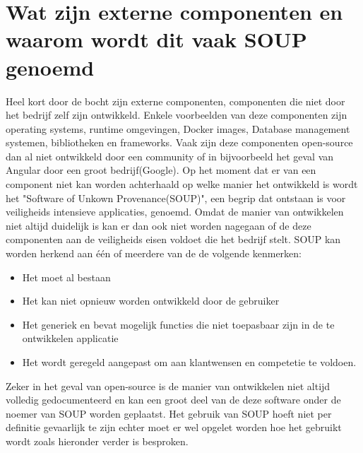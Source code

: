 \section{Wat zijn externe componenten en waarom wordt dit vaak SOUP genoemd}\label{sec:watisSOUP}
Heel kort door de bocht zijn externe componenten, componenten die niet door het bedrijf zelf zijn ontwikkeld. Enkele voorbeelden van deze componenten zijn operating systems, runtime omgevingen, Docker images, Database management systemen, bibliotheken en frameworks. Vaak zijn deze componenten open-source dan al niet ontwikkeld door een community of in bijvoorbeeld het geval van Angular door een groot bedrijf(Google). Op het moment dat er van een component niet kan worden achterhaald op welke manier het ontwikkeld is wordt het "Software of Unkown Provenance(SOUP)", een begrip dat ontstaan is voor veiligheids intensieve applicaties,  genoemd. Omdat de manier van ontwikkelen niet altijd duidelijk is kan er dan ook niet worden nagegaan of de deze componenten aan de veiligheids eisen voldoet die het bedrijf stelt. SOUP kan worden herkend aan één of meerdere van de de volgende kenmerken:
\begin{itemize}
    \item Het moet al bestaan
    \item Het kan niet opnieuw worden ontwikkeld door de gebruiker
    \item Het generiek en bevat mogelijk functies die niet toepasbaar zijn in de te ontwikkelen applicatie
    \item Het wordt geregeld aangepast om aan klantwensen en competetie te voldoen.
\end{itemize}
\citep{Bishop:2001}

Zeker in het geval van open-source is de manier van ontwikkelen niet altijd volledig gedocumenteerd en kan een groot deel van de deze software onder de noemer van SOUP worden geplaatst. Het gebruik van SOUP hoeft niet per definitie gevaarlijk te zijn echter moet er wel opgelet worden hoe het gebruikt wordt zoals hieronder verder is besproken.


